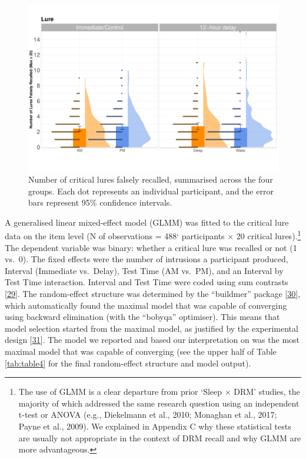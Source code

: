 \documentclass[
]{article}
\begin{document}
\begin{figure}

{\centering \includegraphics{Figures/luregraph} 

}

\caption{Number of critical lures falsely recalled, summarised across the four groups. Each dot represents an individual participant, and the error bars represent 95\% confidence intervals.}\label{fig:lurefig}
\end{figure}

A generalised linear mixed-effect model (GLMM) was fitted to the critical lure data on the item level (N of observations = 488` participants \(\times\) 20 critical lures).\footnote{The use of GLMM is a clear departure from prior ‘Sleep $\times$ DRM’ studies, the majority of which addressed the same research question using an independent t-test or ANOVA (e.g., Diekelmann et al., 2010; Monaghan et al., 2017; Payne et al., 2009). We explained in Appendix C why these statistical tests are usually not appropriate in the context of DRM recall and why GLMM are more advantageous.} The dependent variable was binary: whether a critical lure was recalled or not (1 vs.~0). The fixed effects were the number of intrusions a participant produced, Interval (Immediate vs.~Delay), Test Time (AM vs.~PM), and an Interval by Test Time interaction. Interval and Test Time were coded using sum contrasts {[}\protect\hyperlink{ref-barr2019a}{29}{]}. The random-effect structure was determined by the ``buildmer'' package {[}\protect\hyperlink{ref-voeten2021a}{30}{]}, which automatically found the maximal model that was capable of converging using backward elimination (with the ``bobyqa'' optimiser). This means that model selection started from the maximal model, as justified by the experimental design {[}\protect\hyperlink{ref-barr2013a}{31}{]}. The model we reported and based our interpretation on was the most maximal model that was capable of converging (see the upper half of Table \ref{tab:table4} for the final random-effect structure and model output).
\end{document}

